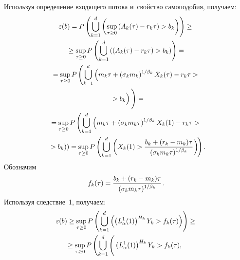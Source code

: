 \begin{multicols}{2}
Используя определение входящего потока и~свойство самоподобия, получаем:
\begin{multline*}
\varepsilon (b) = P\left(\bigcup\limits_{k=1}^d
\left(\sup\limits_{\tau \geq 0} \left(A_k (\tau ) - r_k  \tau \right) >b_k
\right)\right) \geq{}
\\
{}\geq \sup\limits_{\tau \geq 0} P\left(\bigcup\limits_{k=1}^d \left(
\left(A_k (\tau ) - r_k  \tau \right) >b_k \right)\right)= {}
\\
{}= \sup\limits_{\tau\geq 0} P\left(\bigcup\limits_{k=1}^d \left( m_k
\tau +\left(\sigma_k m_k \right)^{1/\beta_k } X_k (\tau ) - r_k \tau  >{}\right.\right.\\
\left.\left.{}> b_k
\vphantom{\left(\sigma_k m_k \right)^{1/\beta_k }}
\right) 
\vphantom{\bigcup\limits_{k=1}^d}
\right) =
\\
{}= \sup\limits_{\tau\geq 0} P\left(\bigcup\limits_{k=1}^d \left( m_k
\tau +\left(\sigma_k m_k \tau \right)^{1/\beta_k } X_k (1) - r_k \tau  >{}\right.\right.\\ 
\hspace*{-7pt}\left.\left.{}>b_k
\right)\right) 
= \sup\limits_{\tau\geq 0} P\left(\bigcup\limits_{k=1}^d \left(  X_k
(1) > \fr{b_k + (r_k - m_k )\tau}{(\sigma_k m_k \tau )^{1/\beta_k
} } \right)\!\right).\hspace*{-7.08pt}
\end{multline*}
Обозначим
$$
f_k (\tau ) =  \displaystyle\frac{\displaystyle b_k + (r_k - m_k )\tau\mathstrut}{\displaystyle (\sigma_k m_k \tau )^{1/\beta_k } \mathstrut} \,.
$$
Используя следствие~1, получаем:
\begin{multline*}
\varepsilon (b) \geq \sup\limits_{\tau\geq 0} P\left(
\bigcup\limits_{k=1}^d \left(  
\left( L_{\alpha}^1 (1) \right)^{H_k}  Y_k  > f_k (\tau ) \right)\right) \geq{}
\\
\hspace*{-4pt}{}\geq \sup\limits_{\tau\geq 0} P\left(\bigcup\limits_{k=1}^d \left(  
\vphantom{\bigcap\limits_{k=1}^d}
\left( L_{\alpha}^1 (1) \right)^{H_k}  Y_k  > f_k (\tau ) , \right.\right.
\end{multline*}


\end{multicols}
